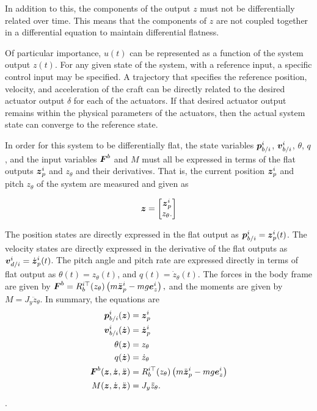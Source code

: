 In addition to this, the components of the output $z$ must not be differentially related over time. 
This means that the components of $z$ are not coupled together in a differential equation to maintain differential flatness.

Of particular importance, $u(t)$ can be represented as a function of the system output $z(t)$.
For any given state of the system, with a reference input, a specific control input may be specified.
A trajectory that specifies the reference position, velocity, and acceleration of the craft can be directly related to the desired actuator output $\delta$ for each of the actuators. 
If that desired actuator output remains within the physical parameters of the actuators, then the actual system state can converge to the reference state. 

In order for this system to be differentially flat, the state variables $\boldsymbol{p}_{b/i}^i$, $\boldsymbol{v}_{b/i}^i$, $\theta$, $q$, and the input variables $\boldsymbol{F}^b$ and $M$ must all be expressed in terms of the flat outputs $\boldsymbol{z}_p^i$ and $z_\theta$ and their derivatives. 
That is, the current position $\boldsymbol{z}_p^i$ and pitch $z_\theta$ of the system are measured and given as

\begin{align}
    \boldsymbol{z} =
    \begin{bmatrix}
        \boldsymbol{z}^i_p\\
        z_{\theta}.
    \end{bmatrix}
\end{align}

The position states are directly expressed in the flat output as $\boldsymbol{p}_{b/i}^i = \boldsymbol{z}_p^i(t)$. 
The velocity states are directly expressed in the derivative of the flat outputs as $\boldsymbol{v}_{d/i}^i = \dot{\boldsymbol{z}}^i_p(t)$. 
The pitch angle and pitch rate are expressed directly in terms of flat output as $\theta(t)=z_\theta(t)$, and $q(t)=\dot{z}_\theta(t)$. 
The forces in the body frame are given by
\(
\boldsymbol{F}^b = R_b^{i\top}(z_\theta)\left(m\ddot{\boldsymbol{z}}_p^i - mg\boldsymbol{e}_z^i\right),
\)
and the moments are given by $M=J_y \ddot{z}_\theta$.
%
In summary, the equations are
\begin{subequations}
\label{eq:differential_flatness_equations}
\begin{align}
\boldsymbol{p}_{b/i}^i(\boldsymbol{z}) &= \boldsymbol{z}_p^i  \\
\boldsymbol{v}_{b/i}^i(\dot{\boldsymbol{z}}) &= \dot{\boldsymbol{z}}_p^i  \\
\theta(\boldsymbol{z}) &= z_\theta  \\
q(\dot{\boldsymbol{z}}) &= \dot{z}_\theta  \\
\boldsymbol{F}^b(\boldsymbol{z}, \dot{\boldsymbol{z}}, \ddot{\boldsymbol{z}}) &= R_b^{i\top}(z_\theta)\left(m\ddot{\boldsymbol{z}}_p^i - mg\boldsymbol{e}_z^i\right)  \\
M(\boldsymbol{z}, \dot{\boldsymbol{z}}, \ddot{\boldsymbol{z}}) &= J_y\ddot{z}_\theta. 
\end{align}
\end{subequations}.

